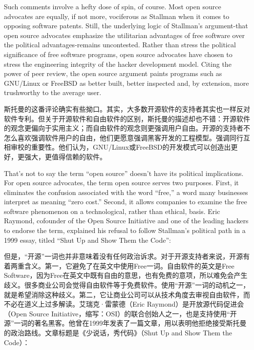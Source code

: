 \ifdefined\eng
Such comments involve a hefty dose of spin, of course. Most open source advocates are equally, if not more, vociferous as Stallman when it comes to opposing software patents. Still, the underlying logic of Stallman's argument-that open source advocates emphasize the utilitarian advantages of free software over the political advantages-remains uncontested. Rather than stress the political significance of free software programs, open source advocates have chosen to stress the engineering integrity of the hacker development model. Citing the power of peer review, the open source argument paints programs such as GNU/Linux or FreeBSD as better built, better inspected and, by extension, more trushworthy to the average user. 
\fi

\ifdefined\chs
斯托曼的这番评论确实有些拗口。其实，大多数开源软件的支持者其实也一样反对软件专利。但关于开源软件和自由软件的区别，斯托曼的描述却也不错：开源软件的观念更偏向于实用主义；而自由软件的观念则更强调用户自由。开源的支持者不怎么喜欢强调软件用户的自由，他们更愿意强调黑客开发的工程模型。强调同行互相审校的重要性。他们认为，GNU/Linux或FreeBSD的开发模式可以创造出更好，更强大，更值得信赖的软件。
\fi

\fi

\ifdefined\vtwo
\ifdefined\eng
That's not to say the term ``open source'' doesn't have its political implications. For open source advocates, the term open source serves two purposes. First, it eliminates the confusion associated with the word ``free,'' a word many businesses interpret as meaning ``zero cost.'' Second, it allows companies to examine the free software phenomenon on a technological, rather than ethical, basis. Eric Raymond, cofounder of the Open Source Initiative and one of the leading hackers to endorse the term, explained his refusal to follow Stallman's political path in a 1999 essay, titled ``Shut Up and Show Them the Code'':
\fi

\ifdefined\chs
但是，``开源''一词也并非意味着没有任何政治诉求。对于开源支持者来说，开源有着两重含义。第一，它避免了在英文中使用Free一词。自由软件的英文是Free Software，因为Free在英文中既有自由的意思，也有免费的意项，所以难免会产生歧义。很多商业公司会觉得自由软件等于免费软件。使用``开源''一词的动机之一，就是希望消除这种歧义。第二，它让商业公司可以从技术角度去审视自由软件，而不必在道义上过多解读。艾瑞克·雷蒙德（Eric Raymond）是开放源代码促进会（Open Source Initiative，缩写：OSI）的联合创始人之一，也是支持使用``开源''一词的著名黑客。他曾在1999年发表了一篇文章，用以表明他拒绝接受斯托曼的政治路线。文章标题是《少说话，秀代码》（Shut Up and Show Them the Code）：
\fi
\fi

